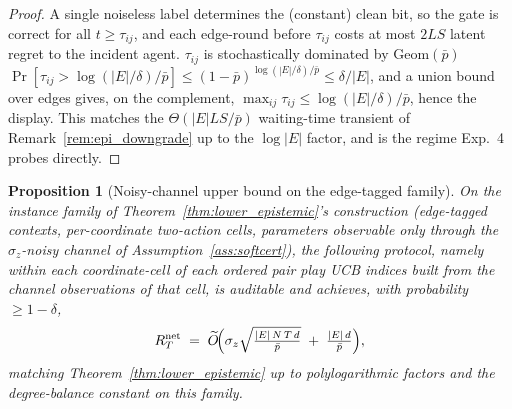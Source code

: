 \documentclass[11pt]{article}
\newtheorem{proposition}[theorem]{Proposition}
\newcommand{\Ot}{\widetilde{O}}
\begin{document}
\begin{proof}
A single noiseless label determines the (constant) clean bit, so the
gate is correct for all $t\geq\tau_{ij}$, and each edge-round before
$\tau_{ij}$ costs at most $2LS$ latent regret to the incident agent.
$\tau_{ij}$ is stochastically dominated by $\mathrm{Geom}(\bar p)$ $\Pr[\tau_{ij}>\log(|E|/\delta)/\bar p]
\leq(1-\bar p)^{\log(|E|/\delta)/\bar p}\leq\delta/|E|$, and a union
bound over edges gives, on the complement,
$\max_{ij}\tau_{ij}\leq\log(|E|/\delta)/\bar p$, hence the display.
This matches the $\Theta(|E|LS/\bar p)$ waiting-time transient of
Remark~\ref{rem:epi_downgrade} up to the $\log|E|$ factor, and is the
regime Exp.~4 probes directly.
\end{proof}

\begin{proposition}[Noisy-channel upper bound on the edge-tagged
family]\label{prop:epi_upper_noisy}
On the instance family of Theorem~\ref{thm:lower_epistemic}'s
construction (edge-tagged contexts, per-coordinate two-action cells,
parameters observable only through the $\sigma_z$-noisy channel of
Assumption~\ref{ass:softcert}), the following protocol, namely within
each coordinate-cell of each ordered pair play UCB indices built from
the channel observations of that cell, is auditable and achieves, with
probability $\geq1-\delta$,
\[
R_T^{\mathrm{net}}
\;=\;\Ot\!\Bigl(\sigma_z\sqrt{\tfrac{|E|\,N\,T\,d}{\bar p}}
\;+\;\tfrac{|E|\,d}{\bar p}\Bigr),
\]
matching Theorem~\ref{thm:lower_epistemic} up to polylogarithmic
factors and the degree-balance constant on this family.
\end{proposition}
\end{document}
